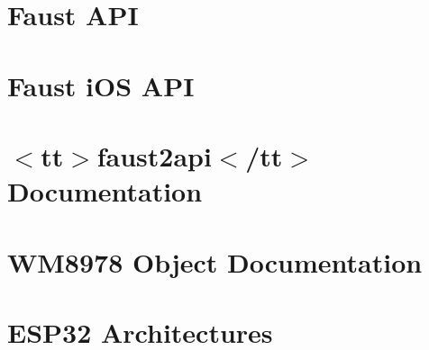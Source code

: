 \let\mypdfximage\pdfximage\def\pdfximage{\immediate\mypdfximage}\documentclass[twoside]{book}
\newcommand{\+}{\discretionary{\mbox{\scriptsize$\hookleftarrow$}}{}{}}
\begin{document}
\chapter{Faust A\+PI}
\label{md__c_1__users_fab_src__github_branches__neural_amp_modeler_plugin_i_plug2__dependencies__build_b0beb59d4b83ee0ee52827cccacb69f8}

\chapter{Faust i\+OS A\+PI}
\label{md__c_1__users_fab_src__github_branches__neural_amp_modeler_plugin_i_plug2__dependencies__build_6f4f48b71cd3b451c039312b2c5185f0}

\chapter{$<$tt$>$faust2api$<$/tt$>$ Documentation}
\label{md__c_1__users_fab_src__github_branches__neural_amp_modeler_plugin_i_plug2__dependencies__build_757add47224c7d1a23daf51e346d8675}

\chapter{W\+M8978 Object Documentation}
\label{md__c_1__users_fab_src__github_branches__neural_amp_modeler_plugin_i_plug2__dependencies__build_74d618614bd4bc2d69a01cdb6e14fdb5}

\chapter{E\+S\+P32 Architectures}
\label{md__c_1__users_fab_src__github_branches__neural_amp_modeler_plugin_i_plug2__dependencies__build_46d4cc147df5913e13fece92c9880ef5}

\end{document}
